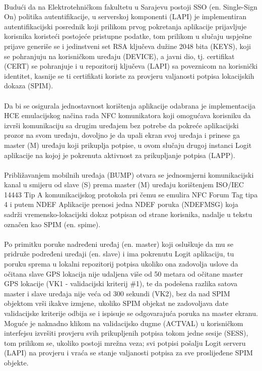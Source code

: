 \paragraph*{}
Budući da na Elektrotehničkom fakultetu u Sarajevu postoji SSO (en. Single-Sign On) politika autentifikacije, u serverskoj komponenti (LAPI) je implementiran autentifikacijski posrednik koji prilikom prvog pokretanja aplikacije prijavljuje korisnika koristeći postojeće pristupne podatke, tom prilikom u slučaju uspješne prijave generiše se i jedinstveni set RSA ključeva dužine 2048 bita (KEYS), koji se pohranjuju na korisničkom uređaju (DEVICE), a javni dio, tj. certifikat (CERT) se pohranjuje i u repozitorij ključeva (LAPI) sa poveznicom na korisnički identitet, kasnije se ti certifikati koriste za provjeru valjanosti potpisa lokacijskih dokaza (SPIM).

\paragraph*{}
Da bi se osigurala jednostavnost korištenja aplikacije odabrana je implementacija HCE emulacijskog načina rada NFC komunikatora koji omogućava korisniku da izvrši komunikaciju sa drugim uređajem bez potrebe da pokreće aplikacijski prozor na svom uređaju, dovoljno je da upali ekran svoj uređaja i prinese ga master (M) uređaju koji prikuplja potpise, u ovom slučaju drugoj instanci Logit aplikacije na kojoj je pokrenuta aktivnost za prikupljanje potpisa (LAPP).

\paragraph*{}
Približavanjem mobilnih uređaja (BUMP) otvara se jednosmjerni komunikacijski kanal u smijeru od slave (S) prema master (M) uređaju korištenjem ISO/IEC 14443 Tip A komunikacijskog protokola pri čemu se emulira NFC Forum Tag tipa 4 i putem NDEF Aplikacije prenosi jedna NDEF poruka (NDEFMSG) koja sadrži vremensko-lokacijski dokaz potpisan od strane korisnika, nadalje u tekstu označen kao SPIM (en. spime)\cite{bruces}.

\paragraph*{}
Po primitku poruke nadređeni uređaj (en. master) koji osluškuje da mu se pridruže podređeni uređaji (en. slave) i ima pokrenutu Logit aplikaciju, tu poruku sprema u lokalni repozitorij potpisa ukoliko ona zadovolja uslove da očitana slave GPS lokacija nije udaljena više od 50 metara od očitane master GPS lokacije (VK1 - validacijski kriterij \#1), te da podešena razlika satova master i slave uređaja nije veća od 300 sekundi (VK2), bez da nad SPIM objektom vrši ikakve izmjene, ukoliko SPIM objekat ne zadovoljava date validacijske kriterije odbija se i ispisuje se odgovarajuća poruka na master ekranu. Moguće je naknadno klikom na validacijsko dugme (ACTVAL) u korisničkom interfejsu izvršiti provjeru svih prikupljenih potpisa tokom jedne sesije (SESS), tom prilikom se, ukoliko postoji mrežna veza; svi potpisi pošalju Logit serveru (LAPI) na provjeru i vraća se stanje valjanosti potpisa za sve proslijeđene SPIM objekte.


